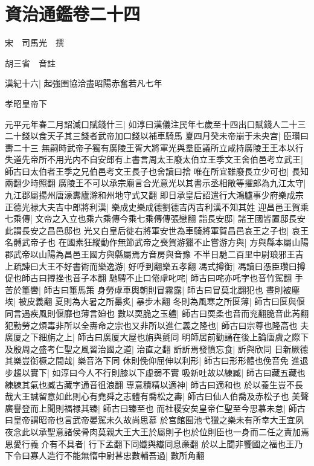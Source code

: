 \chapter{資治通鑑卷二十四}
宋　司馬光　撰

胡三省　音註

漢紀十六|{
	起強圉協洽盡昭陽赤奮若凡七年}


孝昭皇帝下

元平元年春二月詔減口賦錢什三|{
	如淳曰漢儀注民年七歲至十四出口賦錢人二十三二十錢以食天子其三錢者武帝加口錢以補車騎馬}
夏四月癸未帝崩于未央宫|{
	臣瓚曰夀二十三}
無嗣時武帝子獨有廣陵王胥大將軍光與羣臣議所立咸持廣陵王王本以行失道先帝所不用光内不自安郎有上書言周太王廢太伯立王季文王舍伯邑考立武王|{
	師古曰太伯者王季之兄伯邑考文王長子也舍讀曰捨}
唯在所宜雖廢長立少可也|{
	長知兩翻少時照翻}
廣陵王不可以承宗廟言合光意光以其書示丞相敞等擢郎為九江太守|{
	九江郡屬揚州唐濠夀廬滁和州地守式又翻}
即日承皇后詔遣行大鴻臚事少府樂成宗正德光禄大夫吉中郎將利漢|{
	樂成史樂成德劉德吉丙吉利漢不知其姓}
迎昌邑王賀乘七乘傳|{
	文帝之入立也乘六乘傳今乘七乘傳傳張戀翻}
詣長安邸|{
	諸王國皆置邸長安此謂長安之昌邑邸也}
光又白皇后徙右將軍安世為車騎將軍賀昌邑哀王之子也|{
	哀王名髆武帝子也}
在國素狂縱動作無節武帝之喪賀游獵不止嘗游方與|{
	方與縣本屬山陽郡武帝以山陽為昌邑王國方與縣屬焉方音房與音豫}
不半日馳二百里中尉琅邪王吉上疏諫曰大王不好書術而樂逸游|{
	好呼到翻樂五孝翻}
馮式撙衘|{
	馮讀曰憑臣瓚曰撙促也師古曰撙挫也音子本翻}
馳騁不止口倦虖叱咤|{
	師古曰咤亦吒字也音竹駕翻}
手苦於箠轡|{
	師古曰箠馬策}
身勞虖車輿朝則冒霧露|{
	師古曰冒莫北翻犯也}
晝則被塵埃|{
	被皮義翻}
夏則為大暑之所㬥炙|{
	暴步木翻}
冬則為風寒之所匽薄|{
	師古曰匽與偃同言遇疾風則偃靡也薄言廹也}
數以耎脆之玉軆|{
	師古曰耎柔也音而兖翻脆音此芮翻}
犯勤勞之煩毒非所以全夀命之宗也又非所以進仁義之隆也|{
	師古曰宗尊也隆高也}
夫廣厦之下細旃之上|{
	師古曰廣厦大屋也旃與氈同}
明師居前勸誦在後上論唐虞之際下及殷周之盛考仁聖之風習治國之道|{
	治直之翻}
訢訢焉發憤忘食|{
	訢與欣同}
日新厥德其樂豈衘橛之間哉|{
	樂音洛下同}
休則俛仰屈伸以利形|{
	師古曰形形體也俛音免}
進退步趨以實下|{
	如淳曰今人不行則膝以下虛弱不實}
吸新吐故以練臧|{
	師古曰藏五藏也練練其氣也臧古藏字通音徂浪翻}
專意積精以適神|{
	師古曰適和也}
於以養生豈不長哉大王誠留意如此則心有堯舜之志體有喬松之夀|{
	師古曰仙人伯喬及赤松子也}
美聲廣譽登而上聞則福禄其臻|{
	師古曰臻至也}
而社稷安矣皇帝仁聖至今思慕未怠|{
	師古曰皇帝謂昭帝也言武帝晏駕未久故尚思慕}
於宫館囿池弋獵之樂未有所幸大王宜夙夜念此以承聖意諸侯骨肉莫親大王大王於屬則子也於位則臣也一身而二任之責加焉恩愛行義介有不具者|{
	行下孟翻下同孅與纎同息亷翻}
於以上聞非饗國之福也王乃下令曰寡人造行不能無惰中尉甚忠數輔吾過|{
	數所角翻}
